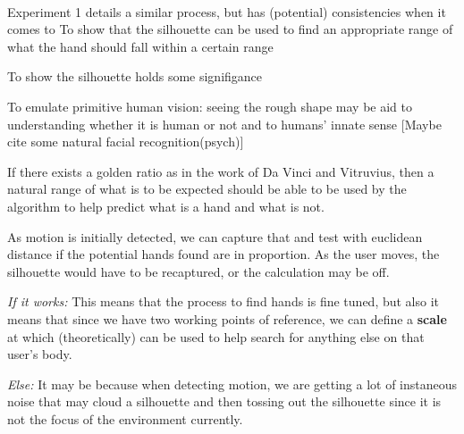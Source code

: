 \documentclass[letterpaper,11pt]{article}
\begin{document}
\pagestyle{empty}

 \\


Experiment 1 details a similar process, but has (potential) consistencies when it comes to 
To show that the silhouette can be used to find an appropriate range of what the hand should fall within a certain range

To show the silhouette holds some signifigance 

To emulate primitive human vision: seeing the rough shape may be aid to understanding whether it is human or not and to humans' innate sense [Maybe cite some natural facial recognition(psych)]
\\


If there exists a golden ratio as in the work of Da Vinci and Vitruvius, then a natural range of what is to be expected should be able to be used by the algorithm to help predict what is a hand and what is not. 
\\


As motion is initially detected, we can capture that and test with euclidean distance if the potential hands found are in proportion. As the user moves, the silhouette would have to be recaptured, or the calculation may be off. 
\\


\emph{If it works:} 
This means that the process to find hands is fine tuned, but also it means that since we have two working points of reference, we can define a \textbf{scale} at which (theoretically) can be used to help search for anything else on that user's body.

\emph{Else:}
It may be because when detecting motion, we are getting a lot of instaneous noise that may cloud a silhouette and then tossing out the silhouette since it is not the focus of the environment currently.
\\
\end{document}
